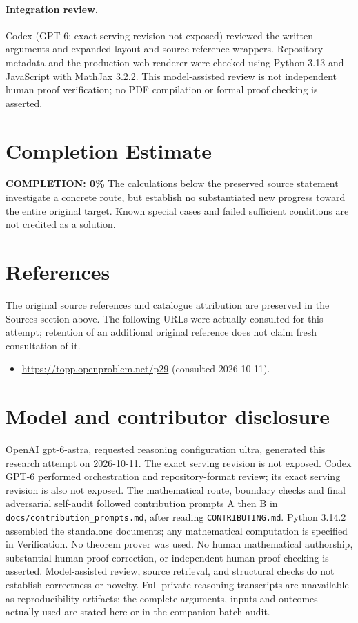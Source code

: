 \documentclass[11pt,a4paper]{article}
\begin{document}
\paragraph{Integration review.} Codex (GPT-6; exact serving revision not exposed) reviewed the written arguments and expanded layout and source-reference wrappers. Repository metadata and the production web renderer were checked using Python 3.13 and JavaScript with MathJax 3.2.2. This model-assisted review is not independent human proof verification; no PDF compilation or formal proof checking is asserted.

\section{Completion Estimate}
\noindent\textbf{COMPLETION: 0\%}
The calculations below the preserved source statement investigate a concrete route,
but establish no substantiated new progress toward the entire original target.
Known special cases and failed sufficient conditions are not credited as a solution.
\section{References}
The original source references and catalogue attribution are preserved in the
Sources section above. The following URLs were actually consulted for this attempt;
retention of an additional original reference does not claim fresh consultation of it.
\begin{itemize}
\item \url{https://topp.openproblem.net/p29} (consulted 2026-10-11). 
\end{itemize}
\section{Model and contributor disclosure}
OpenAI gpt-6-astra, requested reasoning configuration ultra, generated this research
attempt on 2026-10-11. The exact serving revision is not exposed. Codex GPT-6
performed orchestration and repository-format review; its exact serving revision
is also not exposed. The mathematical route, boundary checks and final adversarial
self-audit followed contribution prompts A then B in
\texttt{docs/contribution\_prompts.md}, after reading \texttt{CONTRIBUTING.md}.
Python 3.14.2 assembled the standalone documents; any mathematical computation is
specified in Verification. No theorem prover was used. No human mathematical
authorship, substantial human proof correction, or independent human proof checking
is asserted. Model-assisted review, source retrieval, and structural checks do not
establish correctness or novelty. Full private reasoning transcripts are unavailable
as reproducibility artifacts; the complete arguments, inputs and outcomes actually
used are stated here or in the companion batch audit.
\end{document}

